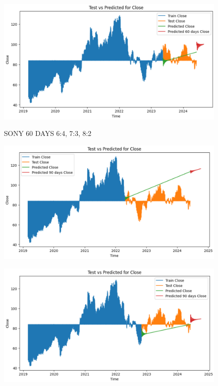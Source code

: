 \documentclass{article}
\begin{document}
\begin{multicols}{2}
\begin{figure}[H]
\begin{minipage}{0.15\textwidth}
    \label{fig:2}
    \end{minipage}%
    \begin{minipage}{0.15\textwidth}
    \centering
    \includegraphics[width=1\textwidth]{Image/VARMA/SONY/8_2/60.png}

    \label{fig:3}
    \end{minipage}
    \caption{SONY 60 DAYS  6:4, 7:3, 8:2 }
\end{figure}

\begin{figure}[H]
    \centering
    \begin{minipage}{0.15\textwidth}
    \centering
    \includegraphics[width=1\textwidth]{Image/VARMA/SONY/6_4/90.png}
   
    \label{fig:1}
    \end{minipage}%
    \begin{minipage}{0.15\textwidth}
    \centering
    \includegraphics[width=1\textwidth]{Image/VARMA/SONY/7_3/90.png}
  

\end{minipage}
\end{figure}
\end{multicols}
\end{document}
